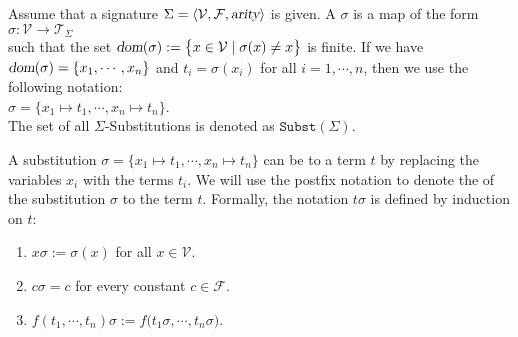 \begin{Definition}
  Assume that a signature $\Sigma = \langle \mathcal{V}, \mathcal{F}, \textsl{arity} \rangle$ is given.
  A  $\sigma$ is a map of the form
  \\[0.2cm]
  \hspace*{1.3cm}
  $\sigma: \mathcal{V} \rightarrow \mathcal{T}_\Sigma$ 
  \\[0.2cm]
  such that the set $\textsl{dom}(\sigma) := \bigl\{ x \in \mathcal{V} \mid \sigma(x) \not= x \bigr\}$ is finite.
  If we have $\textsl{dom}(\sigma) = \{ x_1, \cdots, x_n \}$ and $t_i = \sigma(x_i)$ for all $i = 1, \cdots, n$,
  then we use the following notation:
  \\[0.2cm]
  \hspace*{1.3cm}
  $\sigma = \{ x_1 \mapsto t_1, \cdots, x_n \mapsto t_n \}$.
  \\[0.2cm]
  The set of all $\Sigma$-Substitutions is denoted as $\mathtt{Subst}(\Sigma)$.
  \eoxs
\end{Definition}

A substitution $\sigma = \{ x_1 \mapsto t_1, \cdots, x_n \mapsto t_n \}$ can be  to a term $t$
by replacing the variables $x_i$ with the terms $t_i$.  We will use the postfix notation  to denote the
 of the substitution $\sigma$ to the term $t$.  Formally, the notation $t \sigma$ is defined
by induction on $t$:
\begin{enumerate}
\item $x \sigma := \sigma(x)$ \quad for all $x \in \mathcal{V}$.
\item $c \sigma = c$ \quad for every constant $c \in \mathcal{F}$.
\item $f(t_1, \cdots, t_n) \sigma := f\bigl(t_1\sigma, \cdots, t_n\sigma\bigr)$.
\end{enumerate}

